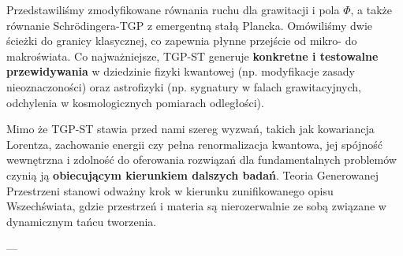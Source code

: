 \documentclass[11pt,a4paper]{article}
\begin{document}
Przedstawiliśmy zmodyfikowane równania ruchu dla grawitacji i pola $\Phi$, a także równanie Schrödingera-TGP z emergentną stałą Plancka. Omówiliśmy dwie ścieżki do granicy klasycznej, co zapewnia płynne przejście od mikro- do makroświata. Co najważniejsze, TGP-ST generuje \textbf{konkretne i testowalne przewidywania} w dziedzinie fizyki kwantowej (np. modyfikacje zasady nieoznaczoności) oraz astrofizyki (np. sygnatury w falach grawitacyjnych, odchylenia w kosmologicznych pomiarach odległości).

Mimo że TGP-ST stawia przed nami szereg wyzwań, takich jak kowariancja Lorentza, zachowanie energii czy pełna renormalizacja kwantowa, jej spójność wewnętrzna i zdolność do oferowania rozwiązań dla fundamentalnych problemów czynią ją \textbf{obiecującym kierunkiem dalszych badań}. Teoria Generowanej Przestrzeni stanowi odważny krok w kierunku zunifikowanego opisu Wszechświata, gdzie przestrzeń i materia są nierozerwalnie ze sobą związane w dynamicznym tańcu tworzenia.

---
\end{document}
